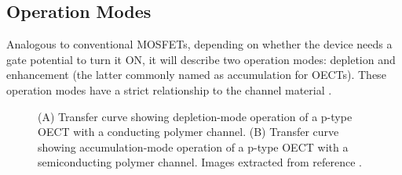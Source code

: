\subsection{Operation Modes}

Analogous to conventional MOSFETs, depending on whether the device needs a gate potential to turn it ON, it will describe two operation modes: depletion and enhancement (the latter commonly named as accumulation for OECTs). These operation modes have a strict relationship to the channel material%
.

\begin{figure}[h]
	\centering
	\hspace{2em}
	\caption[Depletion- and accumulation-mode OECTs]{(A) Transfer curve showing depletion-mode operation of a p-type OECT with a conducting polymer channel. (B) Transfer curve showing accumulation-mode operation of a p-type OECT with a semiconducting polymer channel. Images extracted from reference \cite{rivnayOrganicElectrochemicalTransistors2018}.}
	\label{fig:modes}
\end{figure}

